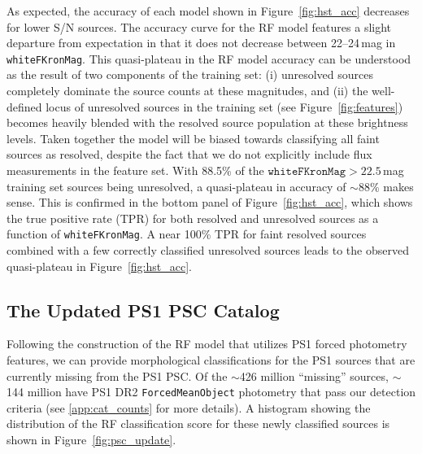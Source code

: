 \documentclass[twocolumn]{aastex63}
\begin{document}
As expected, the accuracy of each model shown in Figure~\ref{fig:hst_acc}
decreases for lower S/N sources. The accuracy curve for the RF model features
a slight departure from expectation in that it does not decrease between
22--24\,mag in \texttt{whiteFKronMag}. This quasi-plateau in the RF model
accuracy can be understood as the result of two components of the training
set: (i) unresolved sources completely dominate the source counts at these
magnitudes, and (ii) the well-defined locus of unresolved sources in the
training set (see Figure~\ref{fig:features}) becomes heavily blended with the
resolved source population at these brightness levels. Taken together the
model will be biased towards classifying all faint sources as resolved,
despite the fact that we do not explicitly include flux measurements in the
feature set. With 88.5\% of the $\mathtt{whiteFKronMag} > 22.5$\,mag training
set sources being unresolved, a quasi-plateau in accuracy of $\sim$88\% makes
sense. This is confirmed in the bottom panel of Figure~\ref{fig:hst_acc},
which shows the true positive rate (TPR) for both resolved and unresolved
sources as a function of \texttt{whiteFKronMag}. A near 100\% TPR for faint
resolved sources combined with a few correctly classified unresolved sources
leads to the observed quasi-plateau in Figure~\ref{fig:hst_acc}.  

\subsection{The Updated PS1 PSC Catalog}\label{sec:ps1psc_update}

Following the construction of the RF model that utilizes PS1 forced photometry
features, we can provide morphological classifications for the PS1 sources
that are currently missing from the PS1 PSC. Of the $\sim$426 million
``missing'' sources, $\sim$144 million have PS1 DR2 \texttt{ForcedMeanObject}
photometry that pass our detection criteria (see \ref{app:cat_counts} for more
details). A histogram showing the distribution of the RF classification score
for these newly classified sources is shown in Figure~\ref{fig:psc_update}.
\end{document}

